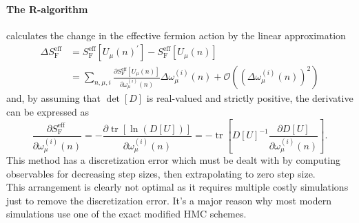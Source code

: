 \documentclass[a4paper,10pt]{article}
\begin{document}
\paragraph{The R-algorithm}\cite{PhysRevD.35.2531} calculates the change in the effective fermion action by the linear approximation 
\begin{equation}
\begin{aligned}
\Delta S_{\mathrm{F}}^{\mathrm{eff}} &=S_{\mathrm{F}}^{\mathrm{eff}}\left[U_{\mu}(n)^{\prime}\right]-S_{\mathrm{F}}^{\mathrm{eff}}\left[U_{\mu}(n)\right] \\
&=\sum_{n, \mu, i} \frac{\partial S_{\mathrm{F}}^{\mathrm{eff}}\left[U_{\mu}(n)\right]}{\partial \omega_{\mu}^{(i)}(n)} \Delta \omega_{\mu}^{(i)}(n)+\mathcal{O}\left(\left(\Delta \omega_{\mu}^{(i)}(n)\right)^{2}\right)
\end{aligned}
\end{equation}
and, by assuming that $\operatorname{det}[D]$ is real-valued and strictly positive, the derivative can be expressed as
\begin{equation}
\frac{\partial S_{\mathrm{F}}^{\text {eff }}}{\partial \omega_{\mu}^{(i)}(n)}=-\frac{\partial \operatorname{tr}[\ln (D[U])]}{\partial \omega_{\mu}^{(i)}(n)}=-\operatorname{tr}\left[D[U]^{-1} \frac{\partial D[U]}{\partial \omega_{\mu}^{(i)}(n)}\right].
\end{equation} 
This method has a discretization error which must be dealt with by computing observables for decreasing step sizes, then extrapolating to zero step size.\\This arrangement is clearly not optimal as it requires multiple costly simulations just to remove the discretization error. It's a major reason why most modern simulations use one of the exact modified HMC schemes.
\end{document}
